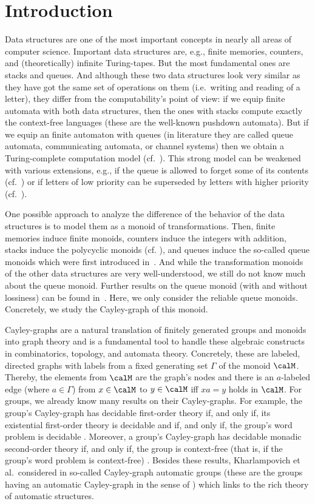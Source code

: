 \section{Introduction}
Data structures are one of the most important concepts in nearly all areas of computer science. Important data structures are, e.g., finite memories, counters, and (theoretically) infinite Turing-tapes. But the most fundamental ones are stacks and queues. And although these two data structures look very similar as they have got the same set of operations on them (i.e.\ writing and reading of a letter), they differ from the computability's point of view: if we equip finite automata with both data structures, then the ones with stacks compute exactly the context-free languages (these are the well-known pushdown automata). But if we equip an finite automaton with queues (in literature they are called queue automata, communicating automata, or channel systems) then we obtain a Turing-complete computation model (cf.~\cite{BraZ83,Bol06}). This strong model can be weakened with various extensions, e.g., if the queue is allowed to forget some of its contents (cf.~\cite{AbdJ96,CecFP96,MasS02}) or if letters of low priority can be superseded by letters with higher priority (cf.~\cite{HaaSS14}).

One possible approach to analyze the difference of the behavior of the data structures is to model them as a monoid of transformations. Then, finite memories induce finite monoids, counters induce the integers with addition, stacks induce the polycyclic monoids (cf. \cite{Sak86,kambites2009}), and queues induce the so-called queue monoids which were first introduced in~\cite{HusKZ17}. And while the transformation monoids of the other data structures are very well-understood, we still do not know much about the queue monoid. Further results on the queue monoid (with and without lossiness) can be found in~\cite{KKP18,Koe18}. Here, we only consider the reliable queue monoids. Concretely, we study the Cayley-graph of this monoid.

Cayley-graphs are a natural translation of finitely generated groups and monoids into graph theory and is a fundamental tool to handle these algebraic constructs in combinatorics, topology, and automata theory. Concretely, these are labeled, directed graphs with labels from a fixed generating set $\varGamma$ of the monoid $\calM$. Thereby, the elements from $\calM$ are the graph's nodes and there is an $a$-labeled edge (where $a\in\varGamma$) from $x\in\calM$ to $y\in\calM$ iff $xa=y$ holds in $\calM$. For groups, we already know many results on their Cayley-graphs. For example, the group's Cayley-graph has decidable first-order theory if, and only if, its existential first-order theory is decidable and if, and only if, the group's word problem is decidable \cite{KusL05}. Moreover, a group's Cayley-graph has decidable monadic second-order theory if, and only if, the group is context-free (that is, if the group's word problem is context-free) \cite{MulS85,KusL05}. Besides these results, Kharlampovich et al.\ considered in \cite{KKM14} so-called Cayley-graph automatic groups (these are the groups having an automatic Cayley-graph in the sense of \cite{KN95}) which links to the rich theory of automatic structures.

